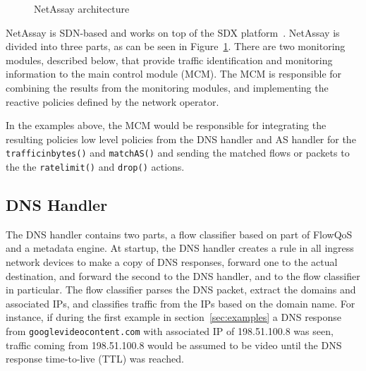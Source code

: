 \documentclass{sig-alternate}
\newcommand\tti[1]{\small\texttt{#1}\normalsize}
\newcommand\system{NetAssay}
\begin{document}
\begin{figure}
    \centering
    \caption{\system{} architecture}
    \label{fig:architecture}
\end{figure}


\system{} is SDN-based and works on top of the SDX platform~\cite{sdx}. %
\system{} is divided into three parts, as can be seen in Figure~\ref{fig:architecture}. There are two monitoring modules, described below, that provide traffic identification and monitoring information to the main control module (MCM). %
The MCM is responsible for combining the results from the monitoring modules, and implementing the reactive policies defined by the network operator.

In the examples above, the MCM would be responsible for integrating the resulting policies low level policies from the DNS handler and AS handler for the \tti{traffic\textunderscore{}in\textunderscore{}bytes()} and \tti{match\textunderscore{}AS()} and sending the matched flows or packets to the the \tti{rate\textunderscore{}limit()} and \tti{drop()} actions.

\subsection{DNS Handler}
The DNS handler contains two parts, a flow classifier based on part of FlowQoS~\cite{FlowQoS} and a metadata engine. %
At startup, the DNS handler creates a rule in all ingress network devices to make a copy of DNS responses, forward one to the actual destination, and forward the second to the DNS handler, and to the flow classifier in particular. The flow classifier parses the DNS packet, extract the domains and associated IPs, and classifies traffic from the IPs based on the domain name. 
For instance, if during the first example in section~\ref{sec:examples} a DNS response from \tti{googlevideocontent.com} with associated IP of 198.51.100.8 was seen, traffic coming from 198.51.100.8 would be assumed to be video until the DNS response time-to-live (TTL) was reached. 
\end{document}
